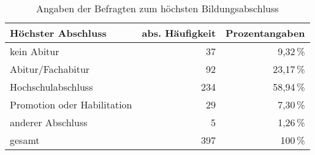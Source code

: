 \begin{table}
\centering
\begin{tabular}{lrr}
\textbf{Höchster Abschluss} & \multicolumn{1}{l}{\textbf{abs. Häufigkeit}} & \multicolumn{1}{l}{\textbf{Prozentangaben}} \\ \hline
kein Abitur & 37 & 9,32\,\%\\ %
Abitur/Fachabitur & 92 & 23,17\,\%\\ %
Hochschulabschluss & 234 & 58,94\,\%\\ %
Promotion oder Habilitation & 29 & 7,30\,\%\\ %
anderer Abschluss & 5 & 1,26\,\%\\ %
gesamt & 397 & 100\,\%
\end{tabular}
\caption{Angaben der Befragten zum höchsten Bildungsabschluss}
\label{table:BildungsstandAnh}
\end{table}

